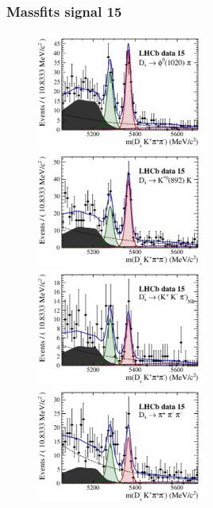 \documentclass[]{beamer}
\begin{document}
\begin{frame}
\frametitle{Massfits signal 15}

\begin{figure}[h]
\includegraphics[height=!,width=0.5\textwidth]{plots/signal_y15_phipi.pdf}
\includegraphics[height=!,width=0.5\textwidth]{plots/signal_y15_KsK.pdf}\\
\includegraphics[height=!,width=0.5\textwidth]{plots/signal_y15_KKpi_NR.pdf}
\includegraphics[height=!,width=0.5\textwidth]{plots/signal_y15_pipipi.pdf}
\end{figure}

\end{frame}
\end{document}
